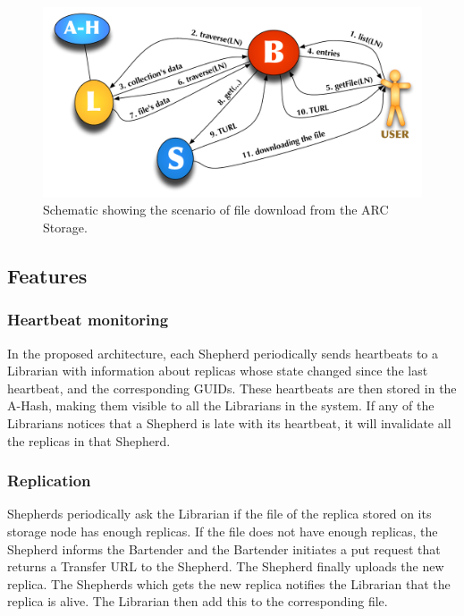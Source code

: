 \documentclass[final]{ieee}
\begin{document}
\begin{figure}
\centering
\includegraphics[width=1.0\columnwidth]{arc1-storage-downloading.pdf}
\caption{Schematic showing the scenario of file download from the ARC Storage.}
\label{arc1-storage-downloading}
\end{figure}  


\subsection{Features}
\subsubsection{Heartbeat monitoring}
\label{Heartbeat and Replication}
In the proposed architecture, each Shepherd periodically sends
heartbeats to a Librarian with information about replicas
whose state changed since the last heartbeat, and the corresponding
GUIDs. These heartbeats are then stored in the A-Hash, making them
visible to all the Librarians in the system. If any of the Librarians
notices that a Shepherd is late with its heartbeat, it will invalidate
all the replicas in that Shepherd.  

\subsubsection{Replication}
\label{Replication}
Shepherds periodically ask the Librarian if the file of the replica stored on
its storage node has enough replicas. If the file does not have
enough replicas, the Shepherd informs the Bartender and the Bartender initiates
a put request that returns a Transfer URL to the Shepherd. The
Shepherd finally uploads the new replica. The Shepherds which gets the new replica notifies the
Librarian that the replica is alive. The Librarian then add this to
the corresponding file.
\end{document}
